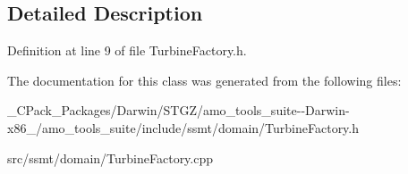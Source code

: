 \subsection{Detailed Description}


Definition at line 9 of file Turbine\+Factory.\+h.



The documentation for this class was generated from the following files\+:\begin{DoxyCompactItemize}
\item 
\+\_\+\+C\+Pack\+\_\+\+Packages/\+Darwin/\+S\+T\+G\+Z/amo\+\_\+tools\+\_\+suite-\/-\/\+Darwin-\/x86\+\_/amo\+\_\+tools\+\_\+suite/include/ssmt/domain/Turbine\+Factory.\+h\item 
src/ssmt/domain/Turbine\+Factory.\+cpp\end{DoxyCompactItemize}
